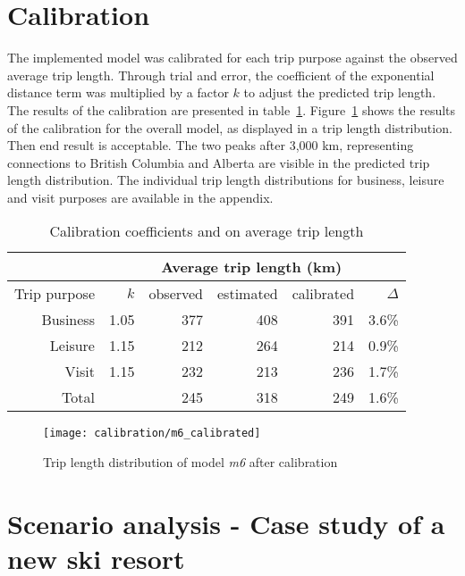 \section{Calibration}

The implemented model was calibrated for each trip purpose against the observed average trip length. Through trial and error, the coefficient of the exponential distance term was multiplied by a factor $k$ to adjust the predicted trip length. The results of the calibration are presented in table~\ref{table:calibration}. Figure~\ref{fig:overall-calibration} shows the results of the calibration for the overall model, as displayed in a trip length distribution. Then end result is acceptable. The two peaks after 3,000 km, representing connections to British Columbia and Alberta are visible in the predicted trip length distribution. The individual trip length distributions for business, leisure and visit purposes are available in the appendix. 


\begin{table}[H]
\centering
\caption{Calibration coefficients and on average trip length}
\label{table:calibration}
\begin{tabular}{@{}rrrrrr@{}}
  \toprule
 &  & \multicolumn{3}{c}{Average trip length (km)} \\ \midrule
 Trip purpose & $k$ & observed & estimated & calibrated & $\Delta$ \\ \midrule
  Business & 1.05 & 377 & 408 & 391 & 3.6\% \\ 
  Leisure & 1.15 & 212 & 264 & 214  & 0.9\% \\
  Visit  & 1.15  & 232 & 213 & 236  & 1.7\%\\   \midrule
  Total  &  & 245 & 318 & 249 & 1.6\% \\ 
   \bottomrule
\end{tabular}
\end{table}

\begin{figure}[H]
\centering
\texttt{[image: calibration/m6\_calibrated]}
\caption{Trip length distribution of model \textit{m6} after calibration}
\label{fig:overall-calibration}
\end{figure}


\section{Scenario analysis - Case study of a new ski resort}
\label{scenario-analysis}

